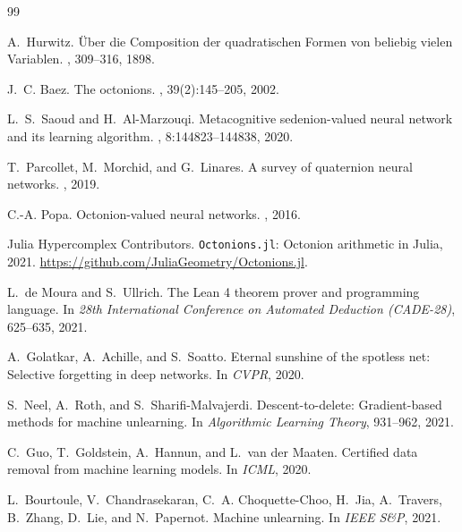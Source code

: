 \documentclass{article}
\begin{document}

\begin{thebibliography}{99}

A.~Hurwitz.
\newblock \"Uber die Composition der quadratischen Formen von beliebig vielen
  Variablen.
, 309--316, 1898.

J.~C. Baez.
\newblock The octonions.
, 39(2):145--205,
  2002.

L.~S.\ Saoud and H.~Al-Marzouqi.
\newblock Metacognitive sedenion-valued neural network and its learning
  algorithm.
, 8:144823--144838, 2020.

T.~Parcollet, M.~Morchid, and G.~Linares.
\newblock A survey of quaternion neural networks.
, 2019.

C.-A. Popa.
\newblock Octonion-valued neural networks.
, 2016.

Julia Hypercomplex Contributors.
\newblock \texttt{Octonions.jl}: Octonion arithmetic in Julia, 2021.
\newblock \url{https://github.com/JuliaGeometry/Octonions.jl}.

L.~de Moura and S.~Ullrich.
\newblock The Lean 4 theorem prover and programming language.
\newblock In {\em 28th International Conference on Automated Deduction
  (CADE-28)}, 625--635, 2021.

A.~Golatkar, A.~Achille, and S.~Soatto.
\newblock Eternal sunshine of the spotless net: Selective forgetting in deep
  networks.
\newblock In {\em CVPR}, 2020.

S.~Neel, A.~Roth, and S.~Sharifi-Malvajerdi.
\newblock Descent-to-delete: Gradient-based methods for machine unlearning.
\newblock In {\em Algorithmic Learning Theory}, 931--962, 2021.

C.~Guo, T.~Goldstein, A.~Hannun, and L.~van der Maaten.
\newblock Certified data removal from machine learning models.
\newblock In {\em ICML}, 2020.

L.~Bourtoule, V.~Chandrasekaran, C.~A. Choquette-Choo, H.~Jia, A.~Travers,
  B.~Zhang, D.~Lie, and N.~Papernot.
\newblock Machine unlearning.
\newblock In {\em IEEE S\&P}, 2021.


\end{thebibliography}
\end{document}

